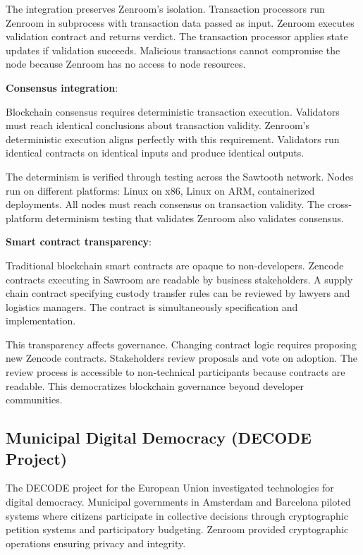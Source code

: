 The integration preserves Zenroom's isolation. Transaction processors
run Zenroom in subprocess with transaction data passed as
input. Zenroom executes validation contract and returns verdict. The
transaction processor applies state updates if validation
succeeds. Malicious transactions cannot compromise the node because
Zenroom has no access to node resources.

\textbf{Consensus integration}:

Blockchain consensus requires deterministic transaction
execution. Validators must reach identical conclusions about
transaction validity. Zenroom's deterministic execution aligns
perfectly with this requirement. Validators run identical contracts on
identical inputs and produce identical outputs.

The determinism is verified through testing across the Sawtooth
network. Nodes run on different platforms: Linux on x86, Linux on ARM,
containerized deployments. All nodes must reach consensus on
transaction validity. The cross-platform determinism testing that
validates Zenroom also validates consensus.

\textbf{Smart contract transparency}:

Traditional blockchain smart contracts are opaque to
non-developers. Zencode contracts executing in Sawroom are readable by
business stakeholders. A supply chain contract specifying custody
transfer rules can be reviewed by lawyers and logistics managers. The
contract is simultaneously specification and implementation.

This transparency affects governance. Changing contract logic requires
proposing new Zencode contracts. Stakeholders review proposals and
vote on adoption. The review process is accessible to non-technical
participants because contracts are readable. This democratizes
blockchain governance beyond developer communities.

\subsection{Municipal Digital Democracy (DECODE Project)}

The DECODE project for the European Union investigated technologies
for digital democracy. Municipal governments in Amsterdam and
Barcelona piloted systems where citizens participate in collective
decisions through cryptographic petition systems and participatory
budgeting. Zenroom provided cryptographic operations ensuring privacy
and integrity.

